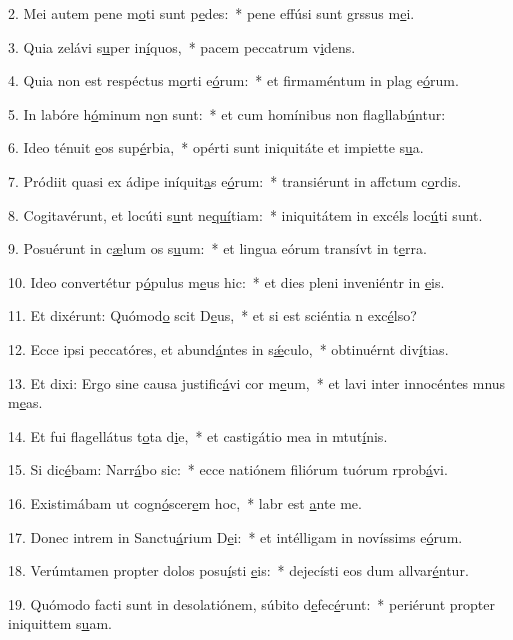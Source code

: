 2. Mei autem pene m\uline{o}ti sunt p\uline{e}des:~* pene effúsi sunt grssus m\uline{e}i.\par 
3. Quia zelávi s\uline{u}per in\uline{í}quos,~* pacem peccatrum v\uline{i}dens.\par 
4. Quia non est respéctus m\uline{o}rti e\uline{ó}rum:~* et firmaméntum in plag e\uline{ó}rum.\par 
5. In labóre h\uline{ó}minum n\uline{o}n sunt:~* et cum homínibus non flagllab\uline{ú}ntur:\par 
6. Ideo ténuit \uline{e}os sup\uline{é}rbia,~* opérti sunt iniquitáte et impiette s\uline{u}a.\par 
7. Pródiit quasi ex ádipe iníquit\uline{a}s e\uline{ó}rum:~* transiérunt in affctum c\uline{o}rdis.\par 
8. Cogitavérunt, et locúti s\uline{u}nt ne\uline{quí}tiam:~* iniquitátem in excéls loc\uline{ú}ti sunt.\par 
9. Posuérunt in c\uline{æ}lum os s\uline{u}um:~* et lingua eórum transívt in t\uline{e}rra.\par 
10. Ideo convertétur p\uline{ó}pulus m\uline{e}us hic:~* et dies pleni inveniéntr in \uline{e}is.\par 
11. Et dixérunt: Quómod\uline{o} scit D\uline{e}us,~* et si est sciéntia n exc\uline{é}lso?\par 
12. Ecce ipsi peccatóres, et abund\uline{á}ntes in s\uline{ǽ}culo,~* obtinuérnt div\uline{í}tias.\par 
13. Et dixi: Ergo sine causa justific\uline{á}vi cor m\uline{e}um,~* et lavi inter innocéntes mnus m\uline{e}as.\par 
14. Et fui flagellátus t\uline{o}ta d\uline{i}e,~* et castigátio mea in mtut\uline{í}nis.\par 
15. Si dic\uline{é}bam: Narr\uline{á}bo sic:~* ecce natiónem filiórum tuórum rprob\uline{á}vi.\par 
16. Existimábam ut cogn\uline{ó}scer\uline{e}m hoc,~* labr est \uline{a}nte me.\par 
17. Donec intrem in Sanctu\uline{á}rium D\uline{e}i:~* et intélligam in novíssims e\uline{ó}rum.\par 
18. Verúmtamen propter dolos posu\uline{í}sti \uline{e}is:~* dejecísti eos dum allvar\uline{é}ntur.\par 
19. Quómodo facti sunt in desolatiónem, súbito d\uline{e}fec\uline{é}runt:~* periérunt propter iniquittem s\uline{u}am.\par 
